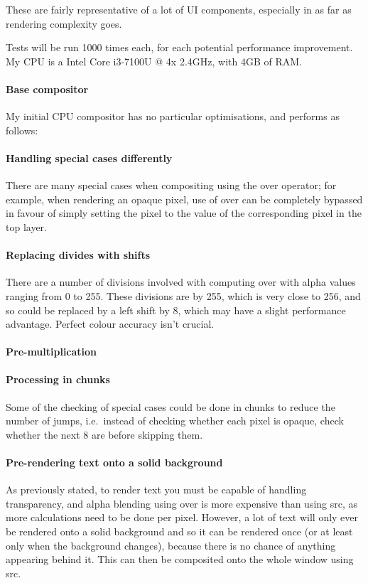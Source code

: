 \documentclass[12pt]{article}
\begin{document}
    These are fairly representative of a lot of UI components, especially in as far as rendering complexity goes.

    Tests will be run 1000 times each, for each potential performance improvement. My CPU is a Intel Core i3-7100U @ 4x 2.4GHz, with 4GB of RAM.

    \paragraph{Base compositor}
     My initial CPU compositor has no particular optimisations, and performs as follows:
    \paragraph{Handling special cases differently}
     There are many special cases when compositing using the \textsf{over} operator; for example, when rendering an opaque pixel, use of \textsf{over} can be completely bypassed in favour of simply setting the pixel to the value of the corresponding pixel in the top layer.
    \paragraph{Replacing divides with shifts}
     There are a number of divisions involved with computing \textsf{over} with alpha values ranging from 0 to 255. These divisions are by 255, which is very close to 256, and so could be replaced by a left shift by 8, which may have a slight performance advantage. Perfect colour accuracy isn't crucial.
    \paragraph{Pre-multiplication}
    \paragraph{Processing in chunks}
     Some of the checking of special cases could be done in chunks to reduce the number of jumps, i.e.~instead of checking whether each pixel is opaque, check whether the next 8 are before skipping them.
    \paragraph{Pre-rendering text onto a solid background}
     As previously stated, to render text you must be capable of handling transparency, and alpha blending using \textsf{over} is more expensive than using \textsf{src}, as more calculations need to be done per pixel. However, a lot of text will only ever be rendered onto a solid background and so it can be rendered once (or at least only when the background changes), because there is no chance of anything appearing behind it. This can then be composited onto the whole window using \textsf{src}.
\end{document}

